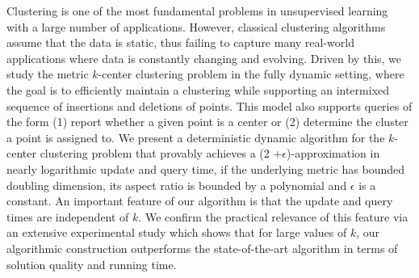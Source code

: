 
Clustering is one of the most fundamental problems in unsupervised learning with a large number of applications. However, classical clustering algorithms assume that the data is static, thus failing to capture many real-world applications where data is constantly changing and evolving. Driven by this, we study the metric $k$-center clustering problem in the fully dynamic setting, where the goal is to efficiently maintain a clustering while supporting an intermixed sequence of insertions and deletions of points. This model also supports queries of the form (1) report whether a given point is a center or (2) determine the cluster a point is assigned to. We present a deterministic dynamic algorithm for the $k$-center clustering problem that provably achieves a (2 +$\epsilon$)-approximation in nearly logarithmic update and query time, if the underlying metric has bounded doubling dimension, its aspect ratio is bounded by a polynomial and $\epsilon$ is a constant. An important feature of our algorithm is that the update and query times are independent of $k$. We confirm the practical relevance of this feature via an extensive experimental study which shows that for large values of $k$, our algorithmic construction outperforms the state-of-the-art algorithm in terms of solution quality and running time.